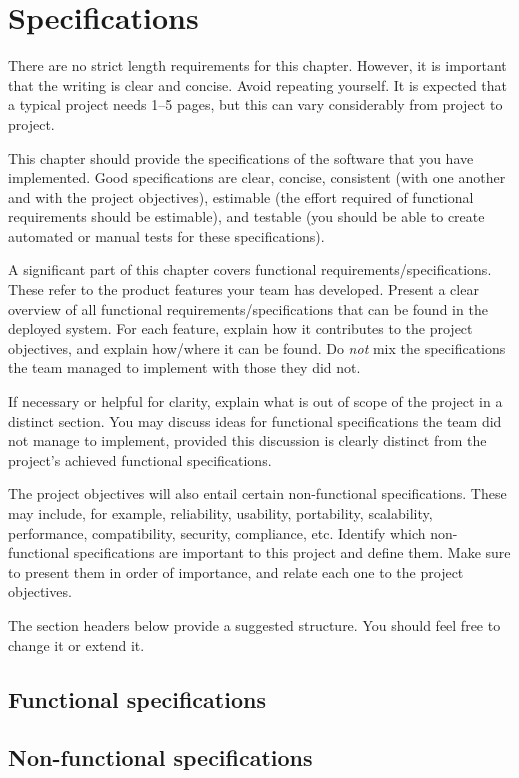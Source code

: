 \chapter{Specifications}
\label{chap:specifications}


\begin{length}
There are no strict length requirements for this chapter.  However, it is important that the writing is clear and concise.  Avoid repeating yourself.  It is expected that a typical project needs 1--5 pages, but this can vary considerably from project to project.
\end{length}

\begin{expectations}
This chapter should provide the specifications of the software that you have implemented.  Good specifications are clear, concise, consistent (with one another and with the project objectives), estimable (the effort required of functional requirements should be estimable), and testable (you should be able to create automated or manual tests for these specifications).

A significant part of this chapter covers functional requirements/specifications.  These refer to the product features your team has developed.  Present a clear overview of all functional requirements/specifications that can be found in the deployed system.  For each feature, explain how it contributes to the project objectives, and explain how/where it can be found.  Do \emph{not} mix the specifications the team managed to implement with those they did not.  

If necessary or helpful for clarity, explain what is out of scope of the project in a distinct section.  You may discuss ideas for functional specifications the team did not manage to implement, provided this discussion is clearly distinct from the project's achieved functional specifications.

The project objectives will also entail certain non-functional specifications.  These may include, for example, reliability, usability, portability, scalability, performance, compatibility, security, compliance, etc.  Identify which non-functional specifications are important to this project and define them.  Make sure to present them in order of importance, and relate each one to the project objectives.  

The section headers below provide a suggested structure.  You should feel free to change it or extend it.
\end{expectations}

\section{Functional specifications}
\label{sect:functional-specifications}

\section{Non-functional specifications}
\label{sect:non-functional-specifications}
